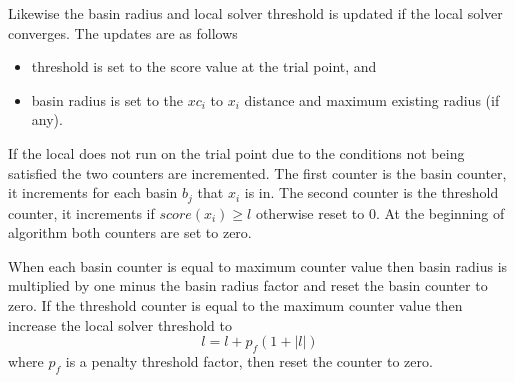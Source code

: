 Likewise the basin radius and local solver threshold is updated if the local solver converges. The updates are as follows
\begin{itemize}
    \item threshold is set to the score value at the trial point, and
    \item basin radius is set to the $xc_i$ to $x_i$ distance and maximum existing radius (if any).
\end{itemize}

If the local does not run on the trial point due to the conditions not being satisfied the two counters are incremented. The first counter is the basin counter, it increments for each basin $b_j$ that $x_i$ is in. The second counter is the threshold counter, it increments if $score(x_i) \geq l$ otherwise reset to 0. At the beginning of algorithm both counters are set to zero. 

When each basin counter is equal to maximum counter value then basin radius is multiplied by one minus the basin radius factor and reset the basin counter to zero. If the threshold counter is equal to the maximum counter value then increase the local solver threshold to
\begin{equation}
    l = l + p_f(1+|l|)
\end{equation}
where $p_f$ is a penalty threshold factor, then reset the counter to zero.

